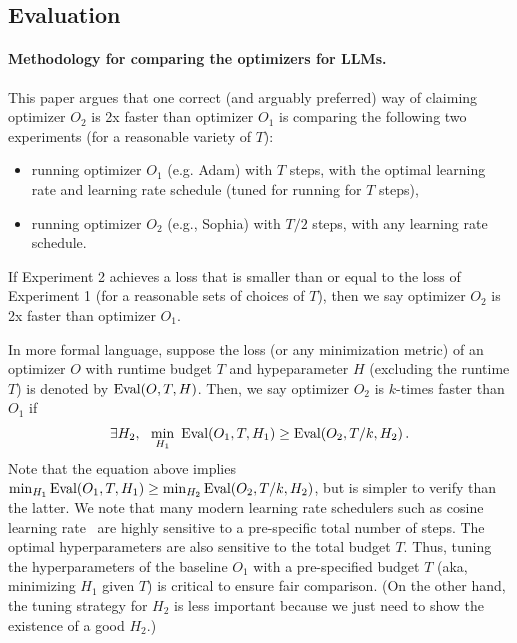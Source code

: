 \subsection{Evaluation} \label{sec:evaluation}


\paragraph{Methodology for comparing the optimizers for LLMs.} This paper argues that one correct (and arguably preferred) way of claiming optimizer $O_2$ is 2x faster than optimizer $O_1$ is  comparing the following two experiments (for a reasonable variety of $T$):
\begin{itemize}
    \item[1.] running optimizer $O_1$ (e.g. Adam) with $T$ steps, with the optimal learning rate and learning rate schedule (tuned for running for $T$ steps),
    \item[2.] running optimizer $O_2$ (e.g., Sophia) with $T/2$ steps, with any learning rate schedule.
\end{itemize}
If Experiment 2 achieves a loss that is smaller than or equal to the loss of Experiment 1 (for a reasonable sets of choices of $T$), then we say optimizer $O_2$ is 2x faster than optimizer $O_1$.

\newcommand{\eval}{\textup{Eval}}
In more formal language, suppose the loss (or any minimization metric) of an optimizer $O$ with runtime budget $T$ and hypeparameter $H$ (excluding the runtime $T$) is denoted by $\eval(O, T, H)$. Then, we say optimizer $O_2$ is $k$-times faster than $O_1$ if 
\begin{align}
    \exists H_2, ~~\min_{H_1} ~\eval(O_1, T, H_1) \ge \eval(O_2, T/k, H_2) \,. \label{eq:compare}
\end{align}
Note that the equation above implies $\min_{H_1}\eval(O_1, T, H_1) \ge \min_{H_2} \eval(O_2, T/k, H_2)$, but is simpler to verify than the latter. 
We note that many modern learning rate schedulers such as cosine learning rate~\citep{loshchilov2016sgdr} are highly sensitive to a pre-specific total number of steps. The optimal hyperparameters are also sensitive to the total budget $T$. Thus, tuning the hyperparameters of the baseline $O_1$ with a pre-specified budget $T$ (aka, minimizing $H_1$ given $T$) is critical to ensure fair comparison. (On the other hand, the tuning strategy for $H_2$ is less important because we just need to show the existence of a good $H_2$.)


